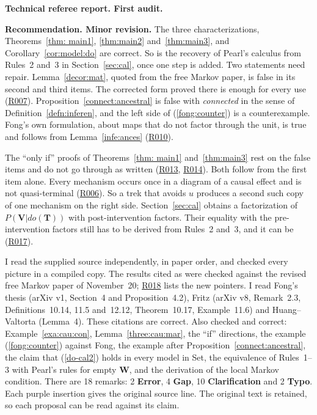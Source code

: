 \documentclass[12pt]{amsart}
\theoremstyle{plain}
\theoremstyle{definition}
\theoremstyle{remark}
\numberwithin{equation}{section}
\theoremstyle{plain}
\newcommand{\0}{\emptyset}
\newcommand{\cat}[1]{\textup{\textsf{#1}}}
\begin{document}
{\normalfont\small\color{RefereePurple}
\noindent\textbf{Technical referee report. First audit.}\par\nobreak
\noindent\textbf{Recommendation. Minor revision.}
The three characterizations, Theorems~\ref{thm: main1}, \ref{thm:main2} and~\ref{thm:main3}, and Corollary~\ref{cor:model:do} are correct. So is the recovery of Pearl's calculus from Rules~2 and~3 in Section~\ref{sec:cal}, once one step is added. Two statements need repair. Lemma~\ref{decor:mat}, quoted from the free Markov paper, is false in its second and third items. The corrected form proved there is enough for every use (\hyperlink{review-007}{R007}). Proposition~\ref{connect:ancestral} is false with \emph{connected} in the sense of Definition~\ref{defn:inferen}, and the left side of (\ref{fong:counter}) is a counterexample. Fong's own formulation, about maps that do not factor through the unit, is true and follows from Lemma~\ref{infe:ances} (\hyperlink{review-010}{R010}).
\par\smallskip
The ``only if'' proofs of Theorems~\ref{thm: main1} and~\ref{thm:main3} rest on the false items and do not go through as written (\hyperlink{review-013}{R013}, \hyperlink{review-014}{R014}). Both follow from the first item alone. Every mechanism occurs once in a diagram of a causal effect and is not quasi-terminal (\hyperlink{review-006}{R006}). So a trek that avoids $u$ produces a second such copy of one mechanism on the right side. Section~\ref{sec:cal} obtains a factorization of $P(\mathbf{V} | do(\mathbf{T}))$ with post-intervention factors. Their equality with the pre-intervention factors still has to be derived from Rules~2 and~3, and it can be (\hyperlink{review-017}{R017}).
\par\smallskip
I read the supplied source independently, in paper order, and checked every picture in a compiled copy. The results cited as \cite{YinZhangModularity} were checked against the revised free Markov paper of November~20; \hyperlink{review-018}{R018} lists the new pointers. I read Fong's thesis (arXiv v1, Section~4 and Proposition~4.2), Fritz (arXiv v8, Remark~2.3, Definitions~10.14, 11.5 and~12.12, Theorem~10.17, Example~11.6) and Huang--Valtorta (Lemma~4). These citations are correct. Also checked and correct: Example~\ref{exa:cau:con}, Lemma~\ref{three:cau:mar}, the ``if'' directions, the example (\ref{fong:counter}) against Fong, the example after Proposition~\ref{connect:ancestral}, the claim that (\ref{do-cal2}) holds in every model in \cat{Set}, the equivalence of Rules~1--3 with Pearl's rules for empty $\mathbf{W}$, and the derivation of the local Markov condition. There are 18 remarks: 2 \textbf{Error}, 4 \textbf{Gap}, 10 \textbf{Clarification} and 2 \textbf{Typo}. Each purple insertion gives the original source line. The original text is retained, so each proposal can be read against its claim.
\par}
\end{document}
